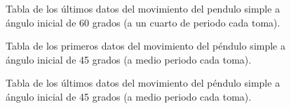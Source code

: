 \documentclass[aps,twocolumn,secnumarabic,nobalancelastpage,amsmath,amssymb,nofootinbib]{revtex4-1}
\begin{document}
		\begin{figure}[!htb]
			\caption{Tabla de los \'ultimos datos del movimiento del pendulo simple a \'angulo inicial de 60 grados (a un cuarto de periodo cada toma).}
			\label{fig:penduloSimple60B}
		\end{figure} 
		
		\begin{figure}[!htb]
			\caption{Tabla de los primeros datos del movimiento del p\'endulo simple a \'angulo inicial de 45 grados (a medio periodo cada toma).}
			\label{fig:penduloSimple45}
		\end{figure} 
		
		\begin{figure}[!htb]
			\caption{Tabla de los \'ultimos datos del movimiento del p\'endulo simple a \'angulo inicial de 45 grados (a medio periodo cada toma).}
			\label{fig:penduloSimple45B}
		\end{figure} 
		
\end{document}
